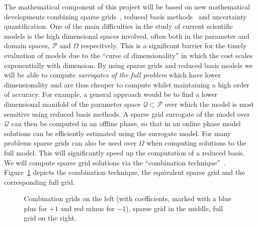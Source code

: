 \documentclass[a4paper,fontsize=12pt]{scrartcl}
\begin{document}
The mathematical component of this project will be based on new
mathematical developments combining sparse grids~\parencite{BungartzGriebel2004}, 
reduced basis methods~\parencite{LiebermanEtal2010,Peherstorfer2013,ChenSchwab2015}
and uncertainty quantification. 
One of the main difficulties in the study of current scientific models is
the high dimensional spaces involved, often both in the parameter and
domain spaces, $\mathcal{P}$ and $\Omega$ respecitvely. 
This is a significant barrier for the timely evaluation of models due to the 
``curse of dimensionality'' in which the cost scales exponentially with dimension.
By using sparse grids and reduced basis models we will be able to compute
{\em surrogates of the full problem} which have lower dimensionality and are thus cheaper  
to compute whilst maintaining a high order of accuracy.
For example, a general approach would be to find a lower dimensional manifold 
of the parameter space $\mathcal{Q}\subset\mathcal{P}$ over which the 
model is most sensitive using reduced basis methods.
A sparse grid surrogate of the model over $\mathcal{Q}$ can then be 
computed in an offline phase, so that in an online phase model solutions
can be efficiently estimated using the surrogate model.
For many problems sparse grids can also be used over $\Omega$ when  
computing solutions to the full model. 
This will significantly speed up the computation of a reduced basis.
We will compute sparse grid solutions via the
``combination technique''~\parencite{Griebel1990}. 
Figure~\ref{fig:sparse_grids} depicts the combination technique, the
equivalent sparse grid and the corresponding full grid. 

\begin{figure}
  \centering
    
  \caption{Combination grids on the left (with coefficients, marked with
    a blue plus for $+1$ and red minus for $-1$), sparse grid in the
    middle, full grid on the right.}
  \label{fig:sparse_grids}
\end{figure}
\end{document}
